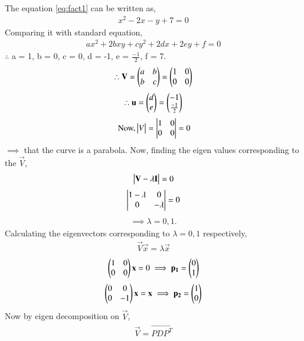 \documentclass[journal,12pt,twocolumn]{IEEEtran}
\begin{document}
		The equation \eqref{eq:fact1} can be written as,
		\begin{align}
			x^2-2x-y+7 = 0
		\end{align}
		Comparing it with standard equation,
		\begin{align}
			ax^2+2bxy+cy^2+2dx+2ey+f = 0
		\end{align}
		$\therefore$ a = 1, b = 0, c = 0, d = -1, e = $\frac{-1}{2}$, f = 7.
		\begin{align}
			\therefore \mathbf{V} = \begin{pmatrix}a&b\\b&c\end{pmatrix} = \begin{pmatrix}1&0\\0&0\end{pmatrix}
		\end{align} 
		\begin{align}
			\therefore\mathbf{u} = \begin{pmatrix}d\\e\end{pmatrix} = \begin{pmatrix}-1\\\frac{-1}{2}\end{pmatrix}\label{eq:eq1}
		\end{align}
		\begin{align}
			\mbox{ Now,} \begin{vmatrix}V\end{vmatrix} = \begin{vmatrix}1&0\\0&0\end{vmatrix} = 0
		\end{align}
		$\implies$ that the curve is a parabola. Now, finding the eigen values corresponding to the $\vec{V}$,
		\begin{align}
			\begin{vmatrix}\mathbf{V}-\lambda\mathbf{I}\end{vmatrix} = 0
		\end{align}
		\begin{align}
			\begin{vmatrix}1-\lambda&0\\0&-\lambda\end{vmatrix} = 0
		\end{align}
		\begin{align}
			\implies \lambda = 0,1.
		\end{align}
		Calculating the eigenvectors corresponding to $\lambda = 0,1$ respectively,
		\begin{align}
			\vec{V}\vec{x} = \lambda\vec{x}
		\end{align}
		\begin{align}
			\begin{pmatrix}1&0\\0&0\end{pmatrix}\mathbf{x} = 0 \implies \mathbf{p_1} = \begin{pmatrix}0\\1\end{pmatrix}
		\end{align}
		\begin{align}
			\begin{pmatrix}0&0\\0&-1\end{pmatrix}\mathbf{x} = \mathbf{x} \implies \mathbf{p_2} = \begin{pmatrix}1\\0\end{pmatrix}
		\end{align}
		Now by eigen decomposition on $\vec{V}$,
		\begin{align}
			\vec{V} = \vec{PDP^T}
			\label{eq:eq2}
		\end{align}
\end{document}
